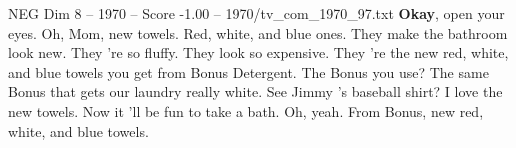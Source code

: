 \begin{textsample}{NEG Dim 8 – 1970 – Score -1.00 – 1970/tv\_com\_1970\_97.txt}  \label{ex:f8_neg_007}
\textbf{Okay}, open your eyes.
Oh, Mom, new towels.
Red, white, and blue ones.
They make the bathroom look new.
They 're so fluffy.
They look so expensive.
They 're the new red, white, and blue towels you get from Bonus Detergent.
The Bonus you use?
The same Bonus that gets our laundry really white.
See Jimmy 's baseball shirt?
I love the new towels.
Now it 'll be fun to take a bath.
Oh, yeah.
From Bonus, new red, white, and blue towels.

\end{textsample}
